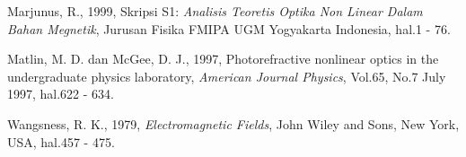 \documentclass{jtetiproposalskripsi}
\begin{document}
\begin{thebibliography}{99}
	Marjunus, R., 1999, Skripsi S1: \emph{Analisis Teoretis Optika
	Non Linear Dalam Bahan Megnetik}, Jurusan Fisika FMIPA UGM Yogyakarta
	Indonesia, hal.1 - 76.

	Matlin, M. D. dan McGee, D. J., 1997, Photorefractive nonlinear
	optics in the undergraduate physics laboratory, \emph{American Journal
	Physics}, Vol.65, No.7 July 1997, hal.622 - 634.

	Wangsness, R. K., 1979, \emph{Electromagnetic Fields}, John
	Wiley and Sons, New York, USA, hal.457 - 475.


\end{thebibliography}
\end{document}
